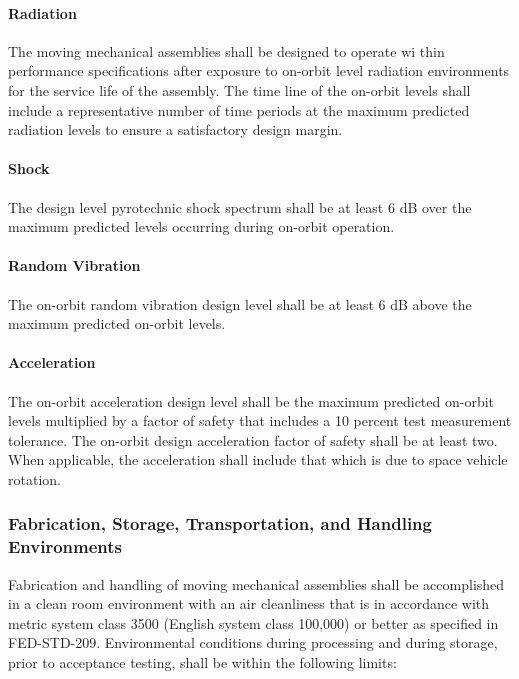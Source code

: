 \documentclass[12pt]{article}
\begin{document}
\paragraph{Radiation} %
The moving mechanical assemblies shall be designed to operate wi thin performance specifications after exposure to on-orbit level radiation environments for the service life of the assembly. 
The time line of the on-orbit levels shall include a representative number of time periods at the maximum predicted radiation levels to ensure a satisfactory design margin.

\paragraph{Shock} %
The design level pyrotechnic shock spectrum shall be at least 6 dB over the maximum predicted levels occurring during on-orbit operation.

\paragraph{Random Vibration} %
The on-orbit random vibration design level shall be at least 6 dB above the maximum predicted on-orbit levels.

\paragraph{Acceleration} %
The on-orbit acceleration design level shall be the maximum predicted on-orbit levels multiplied by a factor of safety that includes a 10 percent test measurement tolerance. 
The on-orbit design acceleration factor of safety shall be at least two. 
When applicable, the acceleration shall include that which is due to space vehicle rotation.

\subsubsection{Fabrication, Storage, Transportation, and Handling Environments} %
Fabrication and handling of moving mechanical assemblies shall be accomplished in a clean room environment with an air cleanliness that is in accordance with metric system class 3500 (English system class 100,000) or better as specified in FED-STD-209. 
Environmental conditions during processing and during storage, prior to acceptance testing, shall be within the following limits:
\end{document}
